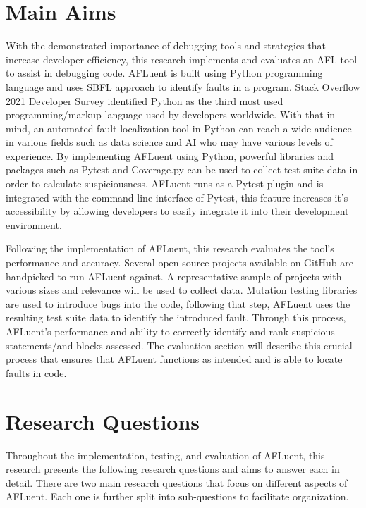 \section{Main Aims}
\label{sec:aims}

With the demonstrated importance of debugging tools and strategies that increase
developer efficiency, this research implements and evaluates an AFL tool to
assist in debugging code. AFLuent is built using  Python programming
language and uses SBFL approach to identify faults in a
program. Stack Overflow 2021 Developer Survey \cite{2021_stackoverflow_survey} 
identified Python as the third
most used programming/markup language used by developers worldwide. With that in
mind, an automated fault localization tool in Python can reach a wide audience
in various fields such as data science and AI who may have various levels of
experience. By implementing AFLuent using Python, powerful libraries and
packages such as Pytest and Coverage.py can be used to collect test suite data
in order to calculate suspiciousness. AFLuent runs as a Pytest plugin and is
integrated with the command line interface of Pytest, this feature increases
it's accessibility by allowing developers to easily integrate it into their
development environment.

Following the implementation of AFLuent, this research evaluates the
tool's performance and accuracy. Several open source projects
available on GitHub are handpicked to run AFLuent against. A representative
sample of projects with various sizes and relevance will be used to collect
data. Mutation testing libraries are used to introduce bugs into the code,
following that step, AFLuent uses the resulting test suite data to identify the
introduced fault. Through this process, AFLuent's performance and ability to
correctly identify and rank suspicious statements/and blocks assessed.
The evaluation section will describe this crucial process that ensures that
AFLuent functions as intended and is able to locate faults in code.

\section{Research Questions}
\label{sec:researchq}

Throughout the implementation, testing, and evaluation of AFLuent, this research
presents the following research questions and aims to answer each in detail.
There are two main research questions that focus on different aspects of
AFLuent. Each one is further split into sub-questions to facilitate organization.

